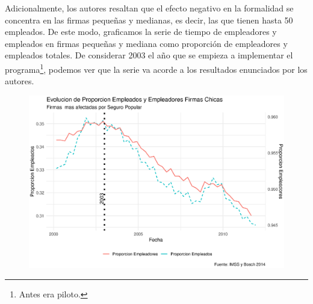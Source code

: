 \documentclass[9pt]{article}
\begin{document}
 \newpage
Adicionalmente, los autores resaltan que el efecto negativo en la formalidad se concentra en las firmas pequeñas y medianas, es decir, las que tienen hasta 50 empleados. De este modo, graficamos la serie de tiempo de empleadores y empleados en firmas peque\~nas y mediana como proporci\'on de empleadores y empleados totales. De considerar 2003 el a\~no que se empieza a implementar el programa\footnote{Antes era piloto.}, podemos ver que la serie va acorde a los resultados enunciados por los autores.  
\begin{figure}[H]
    \centering
    \includegraphics[width=\textwidth]{figs/smallfirms.eps}
\end{figure}
\end{document}
